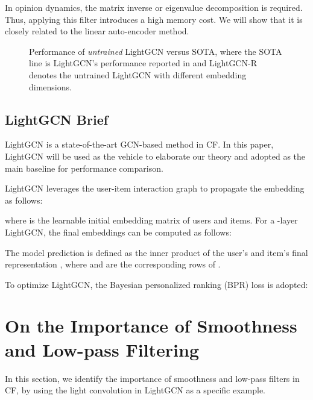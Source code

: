 \documentclass[sigconf]{acmart}
\begin{document}
In opinion dynamics, the matrix inverse or eigenvalue decomposition is required. Thus, applying this filter introduces a high memory cost. We will show that it is closely related to the linear auto-encoder method.
\begin{figure*}[htbp]
    \centering
        \caption{
        Performance of \emph{untrained} LightGCN versus SOTA, where the SOTA line is LightGCN's performance reported in \cite{he2020lightgcn} and LightGCN-R denotes the untrained LightGCN with different embedding dimensions. }
    \label{fig:untrained}
\end{figure*}


\subsection{LightGCN Brief} \label{sec:lightgcn}
LightGCN \cite{he2020lightgcn} is a state-of-the-art GCN-based method in CF. In this paper, LightGCN will be used as the vehicle to elaborate our theory and adopted as the main baseline for performance comparison. 

LightGCN leverages the user-item interaction graph to propagate the embedding as follows:

where  is the learnable initial embedding matrix of users and items. For a -layer LightGCN, the final embeddings can be computed as follows:

The model prediction is defined as the inner product of the user's and item's final representation , where  and  are the corresponding rows of .

To optimize LightGCN, the Bayesian personalized ranking (BPR) loss \cite{rendle2012bpr} is adopted:



\section{On the Importance of Smoothness and Low-pass Filtering}\label{sec:smooth}
In this section, we identify the importance of smoothness and low-pass filters in CF, by using the light convolution in LightGCN as a specific example.
\end{document}
